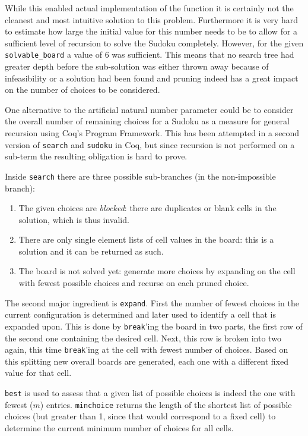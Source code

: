 \documentclass[a4paper,11pt]{article}
\begin{document}
While this enabled actual implementation of the function it is certainly not the cleanest and most intuitive solution to this problem. Furthermore it is very hard to estimate how large the initial value for this number needs to be to allow for a sufficient level of recursion to solve the Sudoku completely. However, for the given \texttt{solvable\_board} a value of 6 was sufficient. This means that no search tree had greater depth before the sub-solution was either thrown away because of infeasibility or a solution had been found and pruning indeed has a great impact on the number of choices to be considered.

One alternative to the artificial natural number parameter could be to consider the overall number of remaining choices for a Sudoku as a measure for general recursion using Coq's Program Framework. This has been attempted in a second version of \texttt{search} and \texttt{sudoku} in Coq, but since recursion is not performed on a sub-term the resulting obligation is hard to prove.

Inside \texttt{search} there are three possible sub-branches (in the non-impossible branch):
\begin{enumerate}
  \item The given choices are \textit{blocked}: there are duplicates or blank cells in the solution, which is thus invalid.
  \item There are only single element lists of cell values in the board: this is a solution and it can be returned as such.
  \item The board is not solved yet: generate more choices by expanding on the cell with fewest possible choices and recurse on each pruned choice.
\end{enumerate}

The second major ingredient is \texttt{expand}. First the number of fewest choices in the current configuration is determined and later used to identify a cell that is expanded upon. This is done by \texttt{break}'ing the board in two parts, the first row of the second one containing the desired cell. Next, this row is broken into two again, this time \texttt{break}'ing at the cell with fewest number of choices. Based on this splitting new overall boards are generated, each one with a different fixed value for that cell.

\texttt{best} is used to assess that a given list of possible choices is indeed the one with fewest (\(m\)) entries. \texttt{minchoice} returns the length of the shortest list of possible choices (but greater than 1, since that would correspond to a fixed cell) to determine the current minimum number of choices for all cells.
\end{document}
